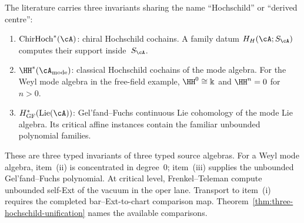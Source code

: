 \begin{remark}%
\label{rem:three-hochschild-invariants}%
%
The literature carries three invariants sharing the
name ``Hochschild'' or ``derived centre'':
\begin{enumerate}
 \item[\textup{(i)}] $\mathrm{ChirHoch}^*(\cA)$: chiral Hochschild
 cochains. A family datum $H_H(\cA;S_\cA)$ computes their support
 inside~$S_\cA$.
 \item[\textup{(ii)}] $\HH^*(\cA_{\mathrm{mode}})$: classical
 Hochschild cochains of the mode algebra.
 For the Weyl mode algebra in the free-field example,
 $\HH^0\cong\Bbbk$ and $\HH^n=0$ for $n>0$.
 \item[\textup{(iii)}] $H^*_{\mathrm{GF}}(\mathrm{Lie}(\cA))$:
 Gel'fand--Fuchs continuous Lie cohomology of the mode Lie algebra.
 Its critical affine instances contain the familiar unbounded
 polynomial families.
\end{enumerate}
These are three typed invariants of three typed source algebras.
For a Weyl mode algebra, item~\textup{(ii)} is concentrated in
degree~$0$; item~\textup{(iii)} supplies the unbounded
Gel'fand--Fuchs polynomial. At critical level, Frenkel--Teleman compute
unbounded self-Ext of the vacuum in the oper lane. Transport to
item~\textup{(i)} requires the completed bar--Ext-to-chart comparison
map. Theorem~\ref{thm:three-hochschild-unification} names the available
comparisons.
\end{remark}

